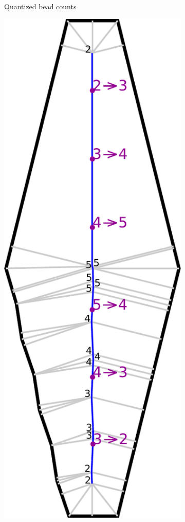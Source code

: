 \begin{figure}
\begin{subfigure}{\figwidth}
\caption{Quantized bead counts}\label{beading_transitioning_filtering__bead_count}
\end{subfigure}
\begin{subfigure}{\figwidth}
\includegraphics[width=\columnwidth]{sources/method/beading_transitioning_filtering__transition_mids.pdf}

\end{subfigure}
\end{figure}

